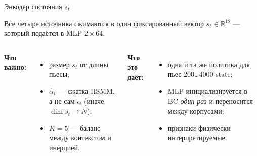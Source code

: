 \begin{frame}{Энкодер состояния $s_t$}
  \small

  Все четыре источника сжимаются в один фиксированный вектор
  $s_t \in \mathbb{R}^{18}$ --- который подаётся в MLP $2\!\times\!64$.

  \vspace{0.6em}
  \begin{center}
    \resizebox{0.92\textwidth}{!}{%
    }
  \end{center}

  \vspace{0.4em}
  \begin{columns}[T,onlytextwidth]
    \footnotesize
    \textbf{Что важно:}
    \begin{itemize}\setlength{\itemsep}{0.2em}
      \item размер $s_t$  от длины пьесы;
      \item $\hat\alpha_t$ --- сжатка HSMM, а не сам $\alpha$
            (иначе $\dim s_t \to N$);
      \item $K{=}5$ --- баланс между контекстом и инерцией.
    \end{itemize}

    \footnotesize
    \textbf{Что это даёт:}
    \begin{itemize}\setlength{\itemsep}{0.2em}
      \item одна и та же политика для пьес 200\ldots4000 state;
      \item MLP инициализируется в BC \emph{один раз} и переносится
            между корпусами;
      \item признаки физически интерпретируемые.
    \end{itemize}
  \end{columns}
\end{frame}
